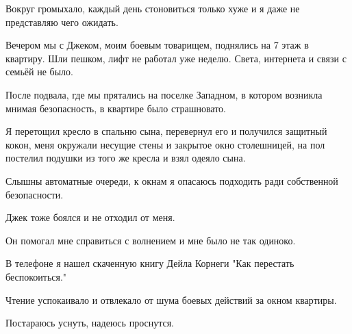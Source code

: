 Вокруг громыхало, каждый день стоновиться только хуже и я даже не представляю
чего ожидать.

Вечером мы с Джеком, моим боевым товарищем, поднялись на 7 этаж в квартиру. Шли
пешком, лифт не работал уже неделю. Света, интернета и  связи с семьёй не было.

После подвала, где мы прятались на поселке Западном, в котором возникла мнимая
безопасность, в квартире было страшновато.

Я перетощил кресло в спальню сына, перевернул его и получился защитный кокон,
меня окружали несущие стены и закрытое окно столешницей,  на пол постелил
подушки из того же кресла и взял одеяло сына. 

Слышны автоматные очереди, к окнам я опасаюсь подходить ради собственной
безопасности.

Джек тоже боялся и не отходил от меня.

Он помогал мне справиться с волнением и мне было не так одиноко.

В телефоне я нашел скаченную книгу Дейла Корнеги "Как перестать беспокоиться."

Чтение успокаивало и отвлекало  от  шума боевых действий за окном квартиры.

Постараюсь уснуть, надеюсь проснутся.
